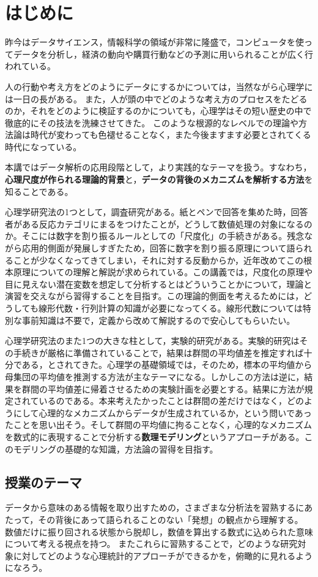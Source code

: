 \section*{はじめに}
昨今はデータサイエンス，情報科学の領域が非常に隆盛で，コンピュータを使ってデータを分析し，経済の動向や購買行動などの予測に用いられることが広く行われている。

人の行動や考え方をどのようにデータにするかについては，当然ながら心理学には一日の長がある。
また，人が頭の中でどのような考え方のプロセスをたどるのか，それをどのように検証するのかについても，心理学はその短い歴史の中で徹底的にその技法を洗練させてきた。
このような根源的なレベルでの理論や方法論は時代が変わっても色褪せることなく，また今後ますます必要とされてくる時代になっている。

本講ではデータ解析の応用段階として，より実践的なテーマを扱う。すなわち，\textbf{心理尺度が作られる理論的背景}と，\textbf{データの背後のメカニズムを解析する方法}を知ることである。

心理学研究法の1つとして，調査研究がある。紙とペンで回答を集めた時，回答者がある反応カテゴリにまるをつけたことが，どうして数値処理の対象になるのか。そこには数字を割り振るルールとしての「尺度化」の手続きがある。残念ながら応用的側面が発展しすぎたため，回答に数字を割り振る原理について語られることが少なくなってきてしまい，それに対する反動からか，近年改めてこの根本原理についての理解と解説が求められている。この講義では，尺度化の原理や目に見えない潜在変数を想定して分析するとはどういうことかについて，理論と演習を交えながら習得することを目指す。この理論的側面を考えるためには，どうしても線形代数・行列計算の知識が必要になってくる。線形代数については特別な事前知識は不要で，定義から改めて解説するので安心してもらいたい。

心理学研究法のまた1つの大きな柱として，実験的研究がある。実験的研究はその手続きが厳格に準備されていることで，結果は群間の平均値差を推定すれば十分である，とされてきた。心理学の基礎領域では，そのため，標本の平均値から母集団の平均値を推測する方法が主なテーマになる。しかしこの方法は逆に，結果を群間の平均値差に帰着させるための実験計画を必要とする。結果に方法が規定されているのである。本来考えたかったことは群間の差だけではなく，どのようにして心理的なメカニズムからデータが生成されているか，という問いであったことを思い出そう。そして群間の平均値に拘ることなく，心理的なメカニズムを数式的に表現することで分析する\textbf{数理モデリング}というアプローチがある。このモデリングの基礎的な知識，方法論の習得を目指す。

\subsection*{授業のテーマ}
データから意味のある情報を取り出すための，さまざまな分析法を習熟するにあたって，その背後にあって語られることのない「発想」の観点から理解する。
数値だけに振り回される状態から脱却し，数値を算出する数式に込められた意味について考える視点を持つ。
またこれらに習熟することで，どのような研究対象に対してどのような心理統計的アプローチができるかを，俯瞰的に見れるようになろう。

